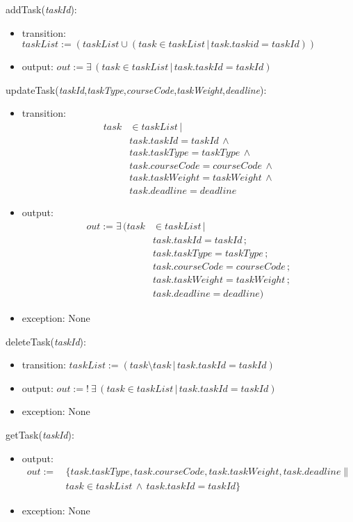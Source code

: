 \documentclass[12pt, titlepage]{article}
\begin{document}
\noindent addTask(\textit{taskId}):
\begin{itemize}
\item transition: \(taskList := (taskList \cup (task \in taskList \, | \, task.taskid = taskId))\)
\item output: $out := \mathit{\exists \, (task \in taskList \, | \, task.taskId = taskId)
}$

\end{itemize}

\noindent updateTask(\textit{taskId},\textit{taskType},\textit{courseCode},\textit{taskWeight},\textit{deadline}):
\begin{itemize}
\item transition:
\begin{align*}
task &\in taskList \, | \\
&task.taskId = taskId \, \land \\
&task.taskType = taskType \, \land \\
&task.courseCode = courseCode \, \land \\
&task.taskWeight = taskWeight \, \land \\
&task.deadline = deadline
\end{align*}
\item output: 
\begin{align*}
out := \exists \, (task &\in taskList \, | \\
&task.taskId = taskId \, ; \\
&task.taskType = taskType \, ; \\
&task.courseCode = courseCode \, ; \\
&task.taskWeight = taskWeight \, ; \\
&task.deadline = deadline)
\end{align*}

\item exception: None
\end{itemize}

\noindent deleteTask(\textit{taskId}):
\begin{itemize}
\item transition: \(taskList := (task \setminus task \, | \, task.taskId = taskId )\)
\item output: $out := \mathit{! \ \exists \, (task \in taskList \, | \, task.taskId = taskId)
}$
\item exception: None
\end{itemize}

\noindent getTask(\textit{taskId}):
\begin{itemize}
\item output: 
\begin{align*}
out := &\, \{task.taskType, task.courseCode, task.taskWeight, task.deadline\| \\
&\, task \in taskList \, \land \, task.taskId = taskId\}
\end{align*}

\item exception: None
\end{itemize}
\end{document}
